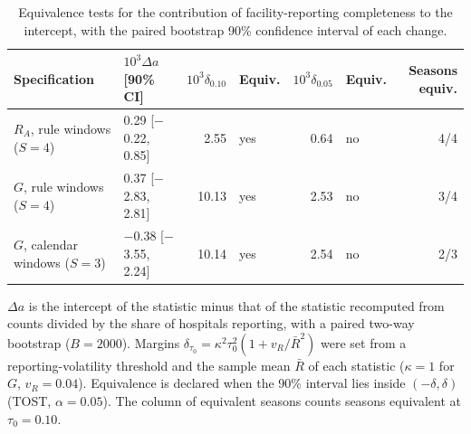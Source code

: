 \begin{table}[htbp]
\centering
\footnotesize
\caption{Equivalence tests for the contribution of facility-reporting completeness to the intercept, with the paired bootstrap 90\% confidence interval of each change.}
\label{tab:s3}
\begin{tabular}{llrlrlr}
\toprule
Specification & $10^3\Delta a$ [90\% CI] & $10^3\delta_{0.10}$ & Equiv. & $10^3\delta_{0.05}$ & Equiv. & Seasons equiv. \\
\midrule
$R_A$, rule windows ($S=4$) & 0.29 [$-$0.22, 0.85] & 2.55 & yes & 0.64 & no & 4/4 \\
$G$, rule windows ($S=4$) & 0.37 [$-$2.83, 2.81] & 10.13 & yes & 2.53 & no & 3/4 \\
$G$, calendar windows ($S=3$) & $-$0.38 [$-$3.55, 2.24] & 10.14 & yes & 2.54 & no & 2/3 \\
\bottomrule
\end{tabular}
\par\smallskip
\begin{minipage}{0.95\linewidth}\scriptsize $\Delta a$ is the intercept of the statistic minus that of the statistic recomputed from counts divided by the share of hospitals reporting, with a paired two-way bootstrap ($B=2000$). Margins $\delta_{\tau_0}=\kappa^2\tau_0^2(1+v_R/\bar{R}^2)$ were set from a reporting-volatility threshold and the sample mean $\bar{R}$ of each statistic ($\kappa=1$ for $G$, $v_R=0.04$). Equivalence is declared when the 90\% interval lies inside $(-\delta,\delta)$ (TOST, $\alpha=0.05$). The column of equivalent seasons counts seasons equivalent at $\tau_0=0.10$.\end{minipage}
\end{table}
